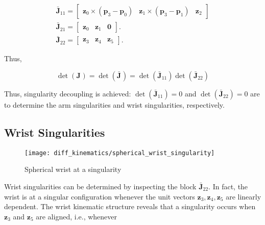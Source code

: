 \documentclass[10pt]{article}
\begin{document}
$$
\begin{gathered}
\boldsymbol{\bar{J}}_{11}=\left[\begin{array}{ccc}
\boldsymbol{z}_{0} \times\left(\boldsymbol{p}_{3}-\boldsymbol{p}_{0}\right) & \boldsymbol{z}_{1} \times\left(\boldsymbol{p}_{3}-\boldsymbol{p}_{1}\right) & \boldsymbol{z}_{2}
\end{array}\right] \\
\boldsymbol{\bar{J}}_{21}=\left[\begin{array}{lll}
\boldsymbol{z}_{0} & \boldsymbol{z}_{1} & \boldsymbol{0}
\end{array}\right] .\\
\boldsymbol{\bar{J}}_{22}=\left[\begin{array}{lll}
\boldsymbol{z}_{3} & \boldsymbol{z}_{4} & \boldsymbol{z}_{5}
\end{array}\right] .
\end{gathered}
$$




Thus, 

$$
\operatorname{det}\left(\boldsymbol{{J}}_{}\right)=\operatorname{det}\left(\boldsymbol{\bar{J}}_{}\right)=\operatorname{det}\left(\boldsymbol{\bar{J}}_{11}\right)\operatorname{det}\left(\boldsymbol{\bar{J}}_{22}\right)
$$



Thus, singularity decoupling is achieved:
$
\operatorname{det}\left(\boldsymbol{\bar{J}}_{11}\right)=0
$
and 
$
\operatorname{det}\left(\boldsymbol{\bar{J}}_{22}\right)=0
$
are to determine the arm singularities and wrist singularities, respectively.





\subsection{Wrist Singularities}

\begin{figure}[H]
    \centering
    \texttt{[image: diff\_kinematics/spherical\_wrist\_singularity]}
    \caption{Spherical wrist at a singularity}
    \label{fig:enter-label}
\end{figure}




Wrist singularities can be determined by inspecting the block $\boldsymbol{\bar{J}}_{22}$. In fact, the wrist is at a singular configuration whenever the unit vectors $\boldsymbol{z}_{3}, \boldsymbol{z}_{4}, \boldsymbol{z}_{5}$ are linearly dependent. The wrist kinematic structure reveals that a singularity occurs when $\boldsymbol{z}_{3}$ and $\boldsymbol{z}_{5}$ are aligned, i.e., whenever
\end{document}

